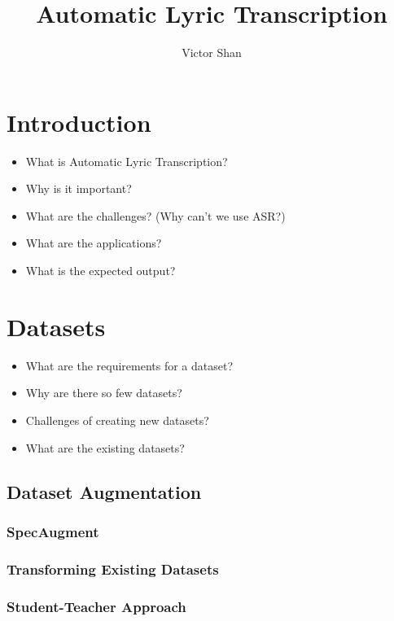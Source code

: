 \documentclass[12pt]{article}
\title{Automatic Lyric Transcription}
\author{Victor Shan}
\begin{document}
\color{red}
\maketitle
\begin{multicols*}{2}
\begin{abstract}
\blindtext
\end{abstract}

\section{Introduction}
\begin{itemize}
    \item What is Automatic Lyric Transcription?
    \item Why is it important?
    \item What are the challenges? (Why can't we use ASR?)
    \item What are the applications?
    \item What is the expected output?
\end{itemize}


\section{Datasets}
\begin{itemize}
    \item What are the requirements for a dataset?
    \item Why are there so few datasets?
    \item Challenges of creating new datasets?
    \item What are the existing datasets?
\end{itemize}
\subsection{Dataset Augmentation}
\subsubsection{SpecAugment}
\subsubsection{Transforming Existing Datasets}
\subsubsection{Student-Teacher Approach}


\end{multicols*}
\end{document}
